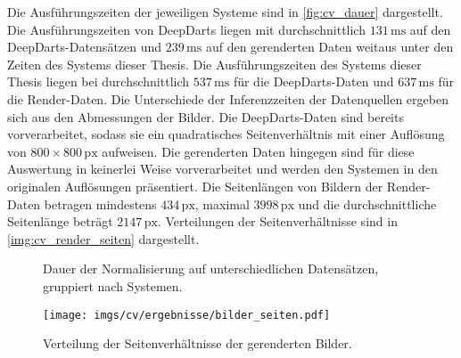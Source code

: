 Die Ausführungszeiten der jeweiligen Systeme sind in \autoref{fig:cv_dauer} dargestellt. Die Ausführungszeiten von DeepDarts liegen mit durchschnittlich $131\,\text{ms}$ auf den DeepDarts-Datensätzen und $239\,\text{ms}$ auf den gerenderten Daten weitaus unter den Zeiten des Systems dieser Thesis. Die Ausführungszeiten des Systems dieser Thesis liegen bei durchschnittlich $537\,\text{ms}$ für die DeepDarts-Daten und $637\,\text{ms}$ für die Render-Daten. Die Unterschiede der Inferenzzeiten der Datenquellen ergeben sich aus den Abmessungen der Bilder. Die DeepDarts-Daten sind bereits vorverarbeitet, sodass sie ein quadratisches Seitenverhältnis mit einer Auflösung von $800 \times 800\,\text{px}$ aufweisen. Die gerenderten Daten hingegen sind für diese Auswertung in keinerlei Weise vorverarbeitet und werden den Systemen in den originalen Auflösungen präsentiert. Die Seitenlängen von Bildern der Render-Daten betragen mindestens $434\,\text{px}$, maximal $3998\,\text{px}$ und die durchschnittliche Seitenlänge beträgt $2147\,\text{px}$. Verteilungen der Seitenverhältnisse sind in \autoref{img:cv_render_seiten} dargestellt.

\begin{figure}
    \centering
    \caption{Dauer der Normalisierung auf unterschiedlichen Datensätzen, gruppiert nach Systemen.}
    \label{fig:cv_dauer}
\end{figure}

\begin{figure}
    \centering
    \texttt{[image: imgs/cv/ergebnisse/bilder\_seiten.pdf]}
    \caption{Verteilung der Seitenverhältnisse der gerenderten Bilder.}
    \label{img:cv_render_seiten}
\end{figure}

